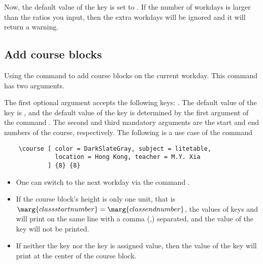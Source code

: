 \documentclass[letterpaper]{l3doc}
\newenvironment{example}{\begin{list}{}{\leftmargin=3em}\item }{\end{list}}
\begin{document}
Now, the default value of the key  is set to . If the number of workdays is larger than the ratios you input, then the extra workdays will be ignored and it will return a warning.

\subsection{Add course blocks}

Using the  command to add course blocks on the current workday. This command has two arguments.

\begin{example}
\end{example}

The first optional argument accepts the following keys:     . The default value of the key  is , and the default value of the key  is determined by the first argument of the command . The second and third mandatory arguments are the start and end numbers of the course, respectively. The following is a use case of the command 

\begin{Verbatim}
    \course [ color = DarkSlateGray, subject = litetable,
              location = Hong Kong, teacher = M.Y. Xia
            ] {8} {8}
\end{Verbatim}

\begin{center}
    \noindent{}
\end{center}

\begin{itemize}
    \item One can switch to the next workday via the command .
    \item If the course block's height is only one unit, that is $\marg{class start number} = \marg{class end number}$, the values of keys  and  will print on the same line with a comma (,) separated, and the value of the key  will not be printed.
    \item If neither the key  nor the key  is assigned value, then the value of the key  will print at the center of the course block.
\end{itemize}


\end{document}
